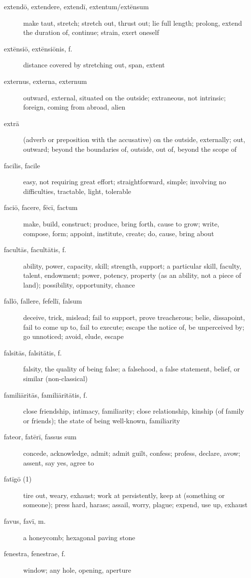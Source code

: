 \begin{description}
    \item[extendō, extendere, extendī, extentum/extēnsum] make taut, stretch; stretch out, thrust out; lie full length; prolong, extend the duration of, continue; strain, exert oneself
    \item[extēnsiō, extēnsiōnis, f.] distance covered by stretching out, span, extent
    \item[externus, externa, externum] outward, external, situated on the outside; extraneous, not intrinsic; foreign, coming from abroad, alien
    \item[extrā] (adverb or preposition with the accusative) on the outside, externally; out, outward; beyond the boundaries of, outside, out of, beyond the scope of
    \item[facilis, facile] easy, not requiring great effort; straightforward, simple; involving no difficulties, tractable, light, tolerable
    \item[faciō, facere, fēcī, factum] make, build, construct; produce, bring forth, cause to grow; write, compose, form; appoint, institute, create; do, cause, bring about
    \item[facultās, facultātis, f.] ability, power, capacity, skill; strength, support; a particular skill, faculty, talent, endowment; power, potency, property (as an ability, not a piece of land); possibility, opportunity, chance
    \item[fallō, fallere, fefellī, falsum] deceive, trick, mislead; fail to support, prove treacherous; belie, dissapoint, fail to come up to, fail to execute; escape the notice of, be unperceived by; go unnoticed; avoid, elude, escape
    \item[falsitās, falsitātis, f.] falsity, the quality of being false; a falsehood, a false statement, belief, or similar (non-classical)
    \item[familiāritās, familiāritātis, f.] close friendship, intimacy, familiarity; close relationship, kinship (of family or friends); the state of being well-known, familiarity
    \item[fateor, fatērī, fassus sum] concede, acknowledge, admit; admit guilt, confess; profess, declare, avow; assent, say yes, agree to
    \item[fatīgō (1)] tire out, weary, exhaust; work at persistently, keep at (something or someone); press hard, harass; assail, worry, plague; expend, use up, exhaust
    \item[favus, favī, m.] a honeycomb; hexagonal paving stone
    \item[fenestra, fenestrae, f.] window; any hole, opening, aperture

\end{description}
